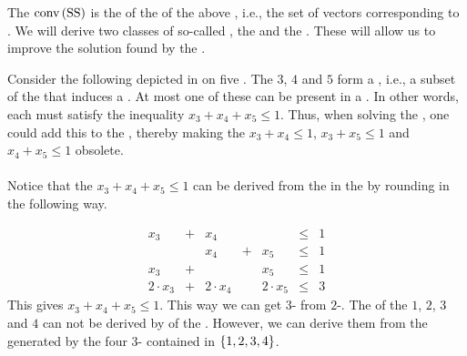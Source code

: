 The  $\mbox{conv}\left( \mbox{SS} \right)$ is the  of the  of the above , i.e., the set of vectors corresponding to . We will derive two classes of so-called , the  and the . These  will allow us to improve the solution found by the .

\begin{example}
Consider the following  depicted in  on five . The  $3$, $4$ and $5$ form a , i.e., a subset of the  that induces a . At most one of these  can be present in a . In other words, each  must satisfy the inequality $x_3+x_4+x_5\leq 1$. Thus, when solving the , one could add this  to the , thereby making the  $x_3+x_4\leq 1$, $x_3+x_5\leq 1$ and $x_4+x_5\leq 1$ obsolete.


\paragraph{}
Notice that the  $x_3+x_4+x_5\leq 1$ can be derived from the  in the  by rounding in the following way.

\begin{equation}
\begin{array}{rcrcrcc}
x_3&+&x_4&&&\leq&1\\
&&x_4&+&x_5&\leq&1\\
x_3&+&&&x_5&\leq&1\\\hline
2\cdot x_3&+&2\cdot x_4&&2\cdot x_5&\leq&3
\end{array}
\end{equation}
This gives $x_3+x_4+x_5\leq 1$. This way we can get $3$- from $2$-. The  of the  $1$, $2$, $3$ and $4$ can not be derived by  of the . However, we can derive them from the  generated by the four $3$- contained in $\left\{ 1,2,3,4 \right\}$.
\end{example}
